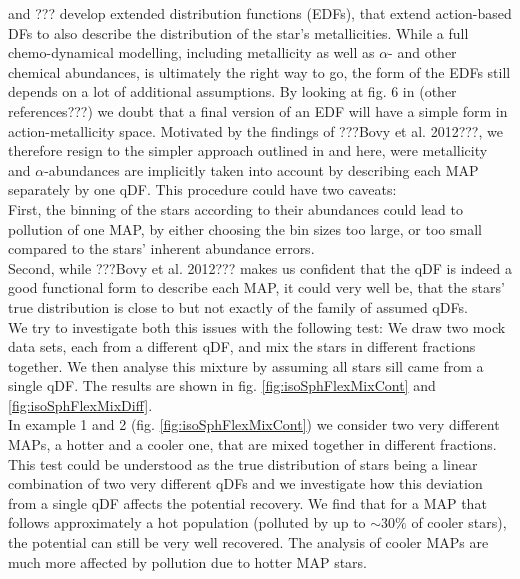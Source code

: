 \documentclass[12pt,preprint]{aastex}
\begin{document}
\cite{san15} and ??? develop extended distribution functions (EDFs), that extend action-based DFs to also describe the distribution of the star's metallicities. While a full chemo-dynamical modelling,  including metallicity as well as $\alpha$- and other chemical abundances, is ultimately the right way to go, the form of the EDFs still depends on a lot of additional assumptions. By looking at fig. 6 in \cite{bov13} (other references???) we doubt that a final version of an EDF will have a simple form in action-metallicity space. Motivated by the findings of ???Bovy et al. 2012???, we therefore resign to the simpler approach outlined in \cite{bov13} and here, were metallicity and $\alpha$-abundances are implicitly taken into account by describing each MAP separately by one qDF. This procedure could have two caveats: 
\\First, the binning of the stars according to their abundances could lead to pollution of one MAP, by either choosing the bin sizes too large, or too small compared to the stars' inherent abundance errors. 
\\Second, while ???Bovy et al. 2012??? makes us confident that the qDF is indeed a good functional form to describe each MAP, it could very well be, that the stars' true distribution is close to but not exactly of the family of assumed qDFs. 
\\We try to investigate both this issues with the following test: We draw two mock data sets, each from a different qDF, and mix the stars in different fractions together. We then analyse this mixture by assuming all stars sill came from a single qDF. The results are shown in fig. \ref{fig:isoSphFlexMixCont} and \ref{fig:isoSphFlexMixDiff}. 
\\In example 1 and 2 (fig. \ref{fig:isoSphFlexMixCont}) we consider two very different MAPs, a hotter and a cooler one, that are mixed together in different fractions. This test could be understood as the true distribution of stars being a linear combination of two very different qDFs and we investigate how this deviation from a single qDF affects the potential recovery. We find that for a MAP that follows approximately a hot population (polluted by up to $\sim30\%$ of cooler stars), the potential can still be very well recovered. The analysis of cooler MAPs are much more affected by pollution due to hotter MAP stars.
\end{document}
